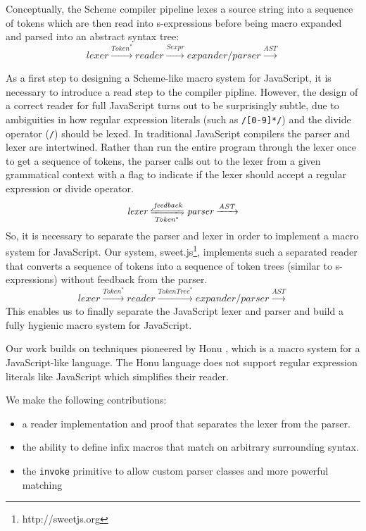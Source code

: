 \documentclass[preprint,10pt]{sigplanconf}
\begin{document}

Conceptually, the Scheme compiler pipeline lexes a source string into
a sequence of tokens which are then read into s-expressions before
being macro expanded and parsed into an abstract syntax tree:
\[
\textit{lexer} \xrightarrow{\textit{Token}^{*}}
\textit{reader} \xrightarrow{\textit{Sexpr}}
\textit{expander/parser} \xrightarrow{\textit{AST}}
\]

As a first step to designing a Scheme-like macro system for
JavaScript, it is necessary to introduce a read step to the compiler
pipline. However, the design of a correct reader for full JavaScript
turns out to be surprisingly subtle, due to ambiguities in how regular
expression literals (such as \lstinline!/[0-9]*/!) and the divide
operator (\lstinline!/!) should be lexed. In traditional JavaScript
compilers the parser and lexer are intertwined. Rather than run the
entire program through the lexer once to get a sequence of tokens, the
parser calls out to the lexer from a given grammatical context with a
flag to indicate if the lexer should accept a regular expression or
divide operator.
\[
\textit{lexer} \xleftrightharpoons[\textit{Token}^{*}]{\textit{feedback}}
\textit{parser} \xrightarrow{\textit{AST}}
\]
So, it is necessary to separate the parser and lexer in order to
implement a macro system for JavaScript. Our system,
sweet.js\footnote{http://sweetjs.org}, implements such a separated
reader that converts a sequence of tokens into a sequence of token
trees (similar to s-expressions) without feedback from the parser.
\[
\textit{lexer} \xrightarrow{\textit{Token}^{*}}
\textit{reader} \xrightarrow{\textit{TokenTree}^{*}}
\textit{expander/parser} \xrightarrow{\textit{AST}}
\]
This enables us to finally separate the JavaScript lexer and parser
and build a fully hygienic macro system for JavaScript.

Our work builds on techniques pioneered by Honu
\cite{Rafkind2012,Rafkind2013}, which is a macro system for a
JavaScript-like language. The Honu language does not support regular
expression literals like JavaScript which simplifies their reader.

We make the following contributions:

\begin{itemize}
\item a reader implementation and proof that separates the lexer from
  the parser.
\item the ability to define infix macros that match on arbitrary
  surrounding syntax.
\item the \texttt{invoke} primitive to allow custom parser classes and
  more powerful matching
\end{itemize}
\end{document}
